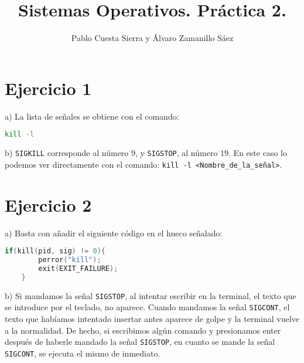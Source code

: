 \documentclass{article}
\begin{document}
\title{Sistemas Operativos. Práctica 2.}
\author{Pablo Cuesta Sierra y Álvaro Zamanillo Sáez}
\maketitle

\begin{tcolorbox}
\tableofcontents
\end{tcolorbox}



\section*{Ejercicio 1}
a) La lista de señales se obtiene con el comando: 

\begin{lstlisting}[language=bash, 
                   backgroundcolor=\color{black},
                   keywordstyle=\color{green},
                   basicstyle=\ttfamily\footnotesize\color{white}]
 kill -l
\end{lstlisting}

b) \texttt{SIGKILL} corresponde al número $9$, y \texttt{SIGSTOP}, al número $19$. En este caso lo podemos ver directamente con el comando:
\texttt{kill -l <Nombre\_de\_la\_señal>}.

\section*{Ejercicio 2}

a) Basta con añadir el siguiente código en el hueco señalado: 


\begin{lstlisting}[language=C, frame=single]
    if(kill(pid, sig) != 0){
        perror("kill");
        exit(EXIT_FAILURE);
    }
\end{lstlisting}

b) Si mandamos la señal \texttt{SIGSTOP}, al intentar escribir en la terminal, el texto que se introduce por el teclado, no aparece. Cuando mandamos la señal \texttt{SIGCONT}, el texto que habíamos intentado insertar antes aparece de golpe y la terminal vuelve a la normalidad.
De hecho, si escribimos algún comando y presionamos enter después de haberle mandado la señal \texttt{SIGSTOP}, en cuanto se mande la señal \texttt{SIGCONT}, se ejecuta el mismo de inmediato.

\end{document}
